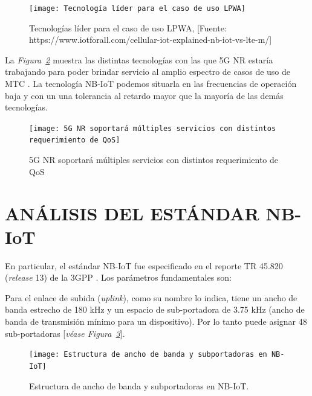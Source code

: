\begin{figure}[th]
\centering
\texttt{[image: Tecnología líder para el caso de uso LPWA]}
\decoRule
\caption[Tecnologías líderes para el caso de uso LPWA]{Tecnologías líder para el caso de uso LPWA, [Fuente: https://www.iotforall.com/cellular-iot-explained-nb-iot-vs-lte-m/]}
\label{fig:lpwa}
\end{figure}


La \textit{Figura~\ref{fig:5gqos}} muestra las distintas tecnologías con las que 5G NR estaría trabajando para poder brindar servicio al amplio espectro de casos de uso de MTC \parencite{5GAmericas}. La tecnología NB-IoT podemos situarla en las frecuencias de operación baja y con un una tolerancia al retardo mayor que la mayoría de las demás tecnologías.

\begin{figure}[th]
\centering
\texttt{[image: 5G NR soportará múltiples servicios con distintos requerimiento de QoS]}
\decoRule
\caption[5G NR soportará múltiples servicios con distintos requerimiento de QoS]{5G NR soportará múltiples servicios con distintos requerimiento de QoS}
\label{fig:5gqos}
\end{figure}


\section{ANÁLISIS DEL ESTÁNDAR NB-IoT} \label{NBIoT}

En particular, el estándar NB-IoT fue especificado en el reporte TR 45.820 (\textit{release} 13) de la 3GPP \parencite{3GPP2019}. Los parámetros fundamentales son:\newline

Para el enlace de subida (\textit{uplink}), como su nombre lo indica, tiene un ancho de banda estrecho de 180 kHz y un espacio de sub-portadora de 3.75 kHz (ancho de banda de transmisión mínimo para un dispositivo). Por lo tanto puede asignar 48 sub-portadoras [\textit{véase Figura~\ref{fig:NBIoT}}].

\begin{figure}[th]
\centering
\texttt{[image: Estructura de ancho de banda y subportadoras en NB-IoT]}
\decoRule
\caption[Estructura de ancho de banda y subportadoras en NB-IoT.]{Estructura de ancho de banda y subportadoras en NB-IoT.}
\label{fig:NBIoT}
\end{figure}


